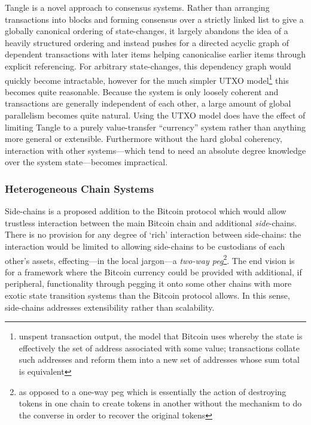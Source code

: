 \documentclass{beamer}
\begin{document}
\begin{frame}
Tangle \cite{iota2016tangle} is a novel approach to consensus systems. Rather than arranging transactions into blocks and forming consensus over a strictly linked list to give a globally canonical ordering of state-changes, it largely abandons the idea of a heavily structured ordering and instead pushes for a directed acyclic graph of dependent transactions with later items helping canonicalise earlier items through explicit referencing. For arbitrary state-changes, this dependency graph would quickly become intractable, however for the much simpler UTXO model\footnote{unspent transaction output, the model that Bitcoin uses whereby the state is effectively the set of address associated with some value; transactions collate such addresses and reform them into a new set of addresses whose sum total is equivalent} this becomes quite reasonable. Because the system is only loosely coherent and transactions are generally independent of each other, a large amount of global parallelism becomes quite natural. Using the UTXO model does have the effect of limiting Tangle to a purely value-transfer ``currency'' system rather than anything more general or extensible. Furthermore without the hard global coherency, interaction with other systems---which tend to need an absolute degree knowledge over the system state---becomes impractical.

\subsubsection{Heterogeneous Chain Systems}\label{heterogenous}

Side-chains \cite{blockstream2014sidechains} is a proposed addition to the Bitcoin protocol which would allow trustless interaction between the main Bitcoin chain and additional \textit{side}-chains. There is no provision for any degree of `rich' interaction between side-chains: the interaction would be limited to allowing side-chains to be custodians of each other's assets, effecting---in the local jargon---a \textit{two-way peg}\footnote{as opposed to a one-way peg which is essentially the action of destroying tokens in one chain to create tokens in another without the mechanism to do the converse in order to recover the original tokens}. The end vision is for a framework where the Bitcoin currency could be provided with additional, if peripheral, functionality through pegging it onto some other chains with more exotic state transition systems than the Bitcoin protocol allows. In this sense, side-chains addresses extensibility rather than scalability.


\end{frame}
\end{document}
